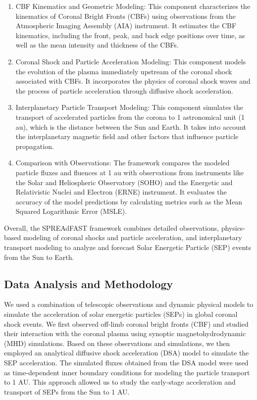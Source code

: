 \begin{enumerate}
    \item CBF Kinematics and Geometric Modeling: This component characterizes the kinematics of Coronal Bright Fronts (CBFs) using observations from the Atmospheric Imaging Assembly (AIA) instrument. It estimates the CBF kinematics, including the front, peak, and back edge positions over time, as well as the mean intensity and thickness of the CBFs.
    \item Coronal Shock and Particle Acceleration Modeling: This component models the evolution of the plasma immediately upstream of the coronal shock associated with CBFs. It incorporates the physics of coronal shock waves and the process of particle acceleration through diffusive shock acceleration.
    \item Interplanetary Particle Transport Modeling: This component simulates the transport of accelerated particles from the corona to 1 astronomical unit (1 au), which is the distance between the Sun and Earth. It takes into account the interplanetary magnetic field and other factors that influence particle propagation.
    \item Comparison with Observations: The framework compares the modeled particle fluxes and fluences at 1 au with observations from instruments like the Solar and Heliospheric Observatory (SOHO) and the Energetic and Relativistic Nuclei and Electron (ERNE) instrument. It evaluates the accuracy of the model predictions by calculating metrics such as the Mean Squared Logarithmic Error (MSLE).
\end{enumerate}
Overall, the SPREAdFAST framework combines detailed observations, physics-based modeling of coronal shocks and particle acceleration, and interplanetary transport modeling to analyze and forecast Solar Energetic Particle (SEP) events from the Sun to Earth.

\subsection{Data Analysis and Methodology}
We used a combination of telescopic observations and dynamic physical models to simulate the acceleration of solar energetic particles (SEPs) in global coronal shock events. We first observed off-limb coronal bright fronts (CBF) and studied their interaction with the coronal plasma using synoptic magnetohydrodynamic (MHD) simulations. Based on these observations and simulations, we then employed an analytical diffusive shock acceleration (DSA) model to simulate the SEP acceleration. The simulated fluxes obtained from the DSA model were used as time-dependent inner boundary conditions for modeling the particle transport to 1 AU. This approach allowed us to study the early-stage acceleration and transport of SEPs from the Sun to 1 AU.

